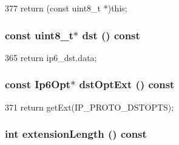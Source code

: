 \begin{DoxyCode}
377 { return (const uint8_t *)this; }
\end{DoxyCode}
\hypertarget{structNet_1_1Ip6Hdr_afbd6887ef6e6210e797a3a2dbc71be8e}{
\subsubsection[{dst}]{\setlength{\rightskip}{0pt plus 5cm}const uint8\_\-t$\ast$ dst () const}}
\label{structNet_1_1Ip6Hdr_afbd6887ef6e6210e797a3a2dbc71be8e}



\begin{DoxyCode}
365 { return ip6_dst.data; }
\end{DoxyCode}
\hypertarget{structNet_1_1Ip6Hdr_a02acb1122703acb86b2730fce2642676}{
\subsubsection[{dstOptExt}]{\setlength{\rightskip}{0pt plus 5cm}const {\bf Ip6Opt}$\ast$ dstOptExt () const}}
\label{structNet_1_1Ip6Hdr_a02acb1122703acb86b2730fce2642676}



\begin{DoxyCode}
371 { return getExt(IP_PROTO_DSTOPTS); }
\end{DoxyCode}
\hypertarget{structNet_1_1Ip6Hdr_a8d453fe4c2ad6428fd6c6ec4c3aa38e2}{
\subsubsection[{extensionLength}]{\setlength{\rightskip}{0pt plus 5cm}int extensionLength () const}}
\label{structNet_1_1Ip6Hdr_a8d453fe4c2ad6428fd6c6ec4c3aa38e2}



